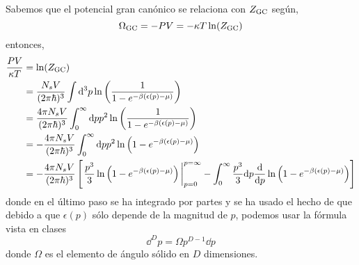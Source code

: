 \begin{sol}
Sabemos que el potencial gran canónico se relaciona con $Z_{\rm GC}$ según,
\begin{equation}\label{Omega zgc}
  \Omega_{\rm GC}=-PV=-\kappa T\ln(Z_{\rm GC} )
\end{equation}
entonces,
\begin{align}
  \frac{PV}{\k T}&=\ln(\zgc)\\
  &=\frac{N_sV}{(2\p\hbar)^3}\int\dd^3p\ln\left(\frac{1}{1-e^{-\b (\epsilon(p)-\m )}}\right)\\
  &=\frac{4\p N_sV}{(2\p\hbar)^3}\int_0^\infty\dd pp^2\ln\left(\frac{1}{1-e^{-\b (\epsilon(p)-\m )}}\right)\\
  &=-\frac{4\p N_sV}{(2\p\hbar)^3}\int_0^\infty\dd pp^2\ln\left(1-e^{-\b(\epsilon(p)-\m )}\right)\\
  &=-\frac{4\p N_sV}{(2\p\hbar)^3}\left[\eval{\frac{p^3}{3}\ln\left(1-e^{-\b(\epsilon(p)-\m )}\right)}_{p=0}^{p=\infty}-\int_0^\infty \frac{p^3}{3}\dd p\dv{p}\ln\left(1-e^{-\b(\epsilon(p)-\m )}\right)\right]
\end{align}
donde en el último paso se ha integrado por partes y se ha usado el hecho de que debido a que $\epsilon(p)$ sólo depende de la magnitud de $p$, podemos usar la fórmula vista en clases
\begin{equation}
  \dd^Dp=\Omega p^{D-1}\dd p
\end{equation}
donde $\Omega$ es el elemento de ángulo sólido en $D$ dimensiones.



\end{sol}
